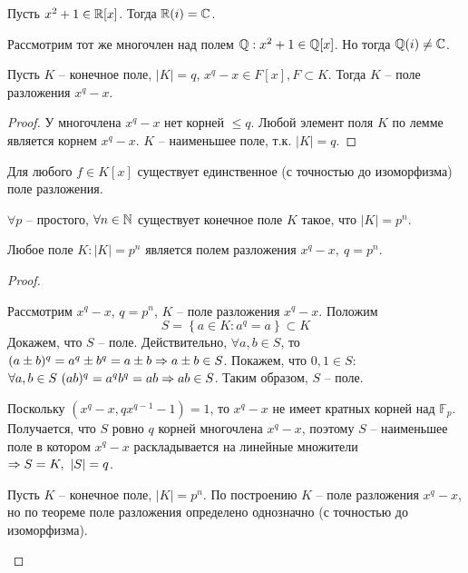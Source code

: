 \begin{Example}
	Пусть $x^2 + 1 \in \mathbb{R}[x]$. Тогда $\mathbb{R}(i) = \mathbb{C}$. 
\end{Example}

\begin{Example}
	Рассмотрим тот же многочлен над полем $\mathbb{Q} : x^2 + 1 \in \mathbb{Q}[x]$. Но тогда $\mathbb{Q}(i) \neq \mathbb{C}$.
\end{Example}

\begin{Lm}
	Пусть $K$ -- конечное поле, $|K| = q$, $x^q - x \in F[x], F \subset K$.
	Тогда $K$ -- поле разложения $x^q - x$.
\end{Lm}

\begin{proof}
	У многочлена $x^q - x$ нет корней $\leqslant q$. Любой элемент поля $K$ по лемме является корнем $x^q - x$.
	$K$ -- наименьшее поле, т.к. $|K| = q$.  
\end{proof}

\begin{Thm}
	Для любого $f \in K[x]$ существует единственное (с точностью до изоморфизма) поле разложения. 
\end{Thm}

\begin{Thm}
	\begin{MyList}
		\item $\forall p$ -- простого, $\forall n \in \mathbb{N}$ существует конечное поле $K$ такое, что $|K| = p^n$.
		\item Любое поле $K : |K| = p^n$ является полем разложения $x^q - x, \ q = p^n$.
	\end{MyList}  
\end{Thm}

\begin{proof}
	\begin{MyList}
		\item Рассмотрим $x^q - x$, $q = p^n$, $K$ -- поле разложения $x^q - x$. Положим
		\[S = \left\{a \in K : a^q = a\right\} \subset K\]
		Докажем, что $S$ -- поле. Действительно, $\forall a, b \in S$, то $(a \pm b)^q = a^q \pm b^q = a \pm b \Rightarrow a \pm b \in S$.
		Покажем, что $0, 1 \in S$: $\forall a, b \in S \ (ab)^q = a^q b^q = ab \Rightarrow ab \in S$.   
		Таким образом, $S$ -- поле.

		Поскольку $(x^q - x, qx^{q - 1} - 1) = 1$, то $x^q - x$ не имеет кратных корней над $\mathbb{F}_p$.
		Получается, что $S$ ровно $q$ корней многочлена $x^q - x$, поэтому $S$ -- наименьшее поле в котором $x^q - x$ раскладывается на линейные множители $\Rightarrow S = K, \ |S| = q$.

		\item Пусть $K$ -- конечное поле, $|K| = p^n$. По построению $K$ -- поле разложения $x^q - x$, но по теореме поле разложения определено однозначно (с точностью до изоморфизма).
	\end{MyList}
\end{proof}


